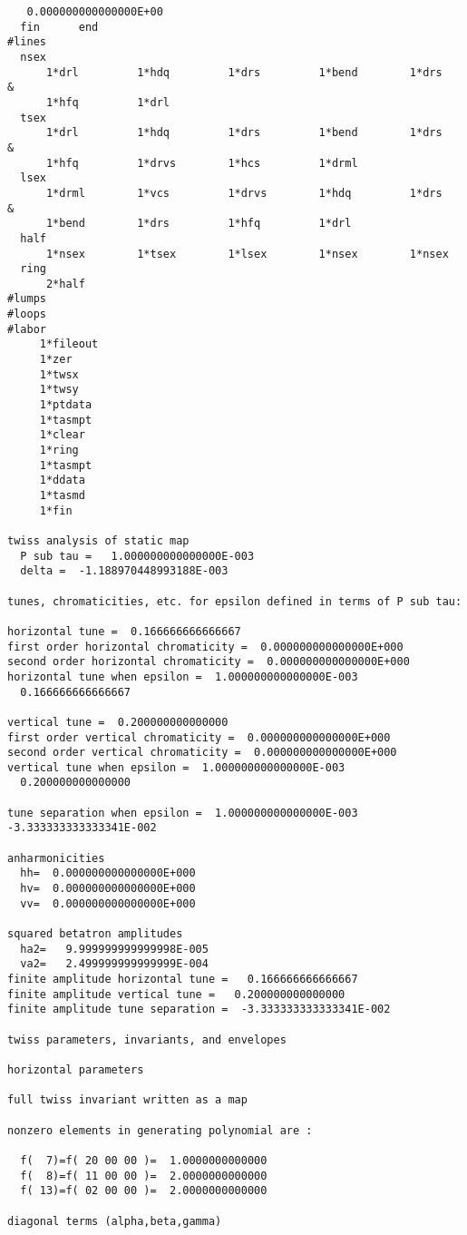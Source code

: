 \begin{footnotesize}
\begin{verbatim}
   0.000000000000000E+00
  fin      end
#lines
  nsex
      1*drl         1*hdq         1*drs         1*bend        1*drs      &
      1*hfq         1*drl
  tsex
      1*drl         1*hdq         1*drs         1*bend        1*drs      &
      1*hfq         1*drvs        1*hcs         1*drml
  lsex
      1*drml        1*vcs         1*drvs        1*hdq         1*drs      &
      1*bend        1*drs         1*hfq         1*drl
  half
      1*nsex        1*tsex        1*lsex        1*nsex        1*nsex
  ring
      2*half
#lumps
#loops
#labor
     1*fileout
     1*zer
     1*twsx
     1*twsy
     1*ptdata
     1*tasmpt
     1*clear
     1*ring
     1*tasmpt
     1*ddata
     1*tasmd
     1*fin

twiss analysis of static map
  P sub tau =   1.000000000000000E-003
  delta =  -1.188970448993188E-003

tunes, chromaticities, etc. for epsilon defined in terms of P sub tau:

horizontal tune =  0.166666666666667
first order horizontal chromaticity =  0.000000000000000E+000
second order horizontal chromaticity =  0.000000000000000E+000
horizontal tune when epsilon =  1.000000000000000E-003
  0.166666666666667

vertical tune =  0.200000000000000
first order vertical chromaticity =  0.000000000000000E+000
second order vertical chromaticity =  0.000000000000000E+000
vertical tune when epsilon =  1.000000000000000E-003
  0.200000000000000

tune separation when epsilon =  1.000000000000000E-003
-3.333333333333341E-002

anharmonicities
  hh=  0.000000000000000E+000
  hv=  0.000000000000000E+000
  vv=  0.000000000000000E+000

squared betatron amplitudes
  ha2=   9.999999999999998E-005
  va2=   2.499999999999999E-004
finite amplitude horizontal tune =   0.166666666666667
finite amplitude vertical tune =   0.200000000000000
finite amplitude tune separation =  -3.333333333333341E-002

twiss parameters, invariants, and envelopes

horizontal parameters

full twiss invariant written as a map

nonzero elements in generating polynomial are :

  f(  7)=f( 20 00 00 )=  1.0000000000000
  f(  8)=f( 11 00 00 )=  2.0000000000000
  f( 13)=f( 02 00 00 )=  2.0000000000000

diagonal terms (alpha,beta,gamma)


\end{verbatim}
\end{footnotesize}
